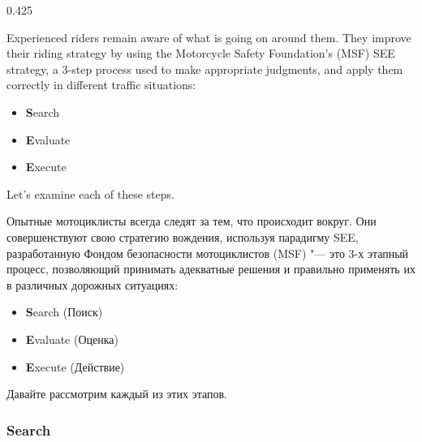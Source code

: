 

\begin{langblock}{0.425}
	\begin{eng}
	Experienced riders remain aware of what is going on around them. They improve their riding strategy by using the Motorcycle Safety Foundation's (MSF) SEE strategy, a 3-step process used to make appropriate judgments, and apply them correctly in different traffic situations:
	
	\begin{itemize}
		\item \textbf{S}earch
		\item \textbf{E}valuate		
		\item \textbf{E}xecute
	\end{itemize}
	
	Let's examine each of these steps.
	\end{eng}
	\begin{rus}
		Опытные мотоциклисты всегда следят за тем, что происходит вокруг. Они совершенствуют свою стратегию вождения, используя парадигму SEE, разработанную Фондом безопасности мотоциклистов (MSF) "--- это 3-х этапный процесс, позволяющий принимать адекватные решения и правильно применять их в различных дорожных ситуациях:
		\begin{itemize}
			\item \textbf{S}earch (Поиск)
			\item \textbf{E}valuate (Оценка)
			\item \textbf{E}xecute (Действие)
		\end{itemize}
		
		Давайте рассмотрим каждый из этих этапов.
\end{rus}
\end{langblock}




\subsubsection*{Search}


